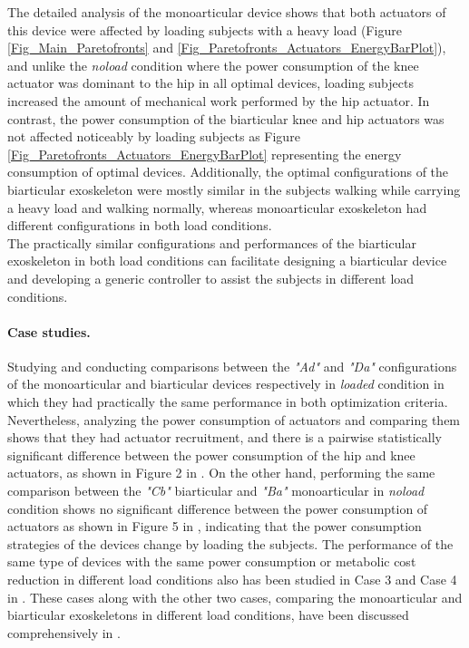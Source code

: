\documentclass[10pt,letterpaper]{article}
\begin{document}
The detailed analysis of the monoarticular device shows that both actuators of this device were affected by loading subjects with a heavy load (Figure \ref{Fig_Main_Paretofronts} and \ref{Fig_Paretofronts_Actuators_EnergyBarPlot}), and unlike the \textit{noload} condition where the power consumption of the knee actuator was dominant to the hip in all optimal devices, loading subjects increased the amount of mechanical work performed by the hip actuator. In contrast, the power consumption of the biarticular knee and hip actuators was not affected noticeably by loading subjects as Figure \ref{Fig_Paretofronts_Actuators_EnergyBarPlot} representing the energy consumption of optimal devices. Additionally, the optimal configurations of the biarticular exoskeleton were mostly similar in the subjects walking while carrying a heavy load and walking normally, whereas monoarticular exoskeleton had different configurations in both load conditions.\\
The practically similar configurations and performances of the biarticular exoskeleton in both load conditions can facilitate designing a biarticular device and developing a generic controller to assist the subjects in different load conditions.\\
\paragraph*{Case studies.} Studying and conducting comparisons between the {\it "Ad"} and {\it "Da"} configurations of the monoarticular and biarticular devices respectively in {\it loaded} condition in which they had practically the same performance in both optimization criteria. Nevertheless, analyzing the power consumption of actuators and comparing them shows that they had actuator recruitment, and there is a pairwise statistically significant difference between the power consumption of the hip and knee actuators, as shown in Figure 2 in . On the other hand, performing the same comparison between the {\it "Cb"} biarticular and {\it "Ba"} monoarticular in {\it noload} condition shows no significant difference between the power consumption of actuators as shown in Figure 5 in , indicating that the power consumption strategies of the devices change by loading the subjects. The performance of the same type of devices with the same power consumption or metabolic cost reduction in different load conditions also has been studied in Case 3 and Case 4 in . These cases along with the other two cases, comparing the monoarticular and biarticular exoskeletons in different load conditions, have been discussed comprehensively in .
\end{document}
